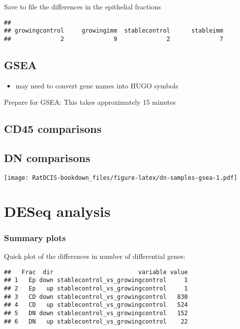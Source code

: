 \documentclass[
]{book}
\providecommand{\tightlist}{%
  \setlength{\itemsep}{0pt}\setlength{\parskip}{0pt}}
\begin{document}
Save to file the differences in the epithelial fractions

\begin{verbatim}
## 
## growingcontrol     growingimm  stablecontrol      stableimm 
##              2              9              2              7
\end{verbatim}

\hypertarget{gsea}{%
\section{GSEA}\label{gsea}}

\begin{itemize}
\tightlist
\item
  may need to convert gene names into HUGO symbols
\end{itemize}

Prepare for GSEA: This takes approximately 15 minutes

\hypertarget{cd45-comparisons}{%
\section{CD45 comparisons}\label{cd45-comparisons}}

\hypertarget{dn-comparisons}{%
\section{DN comparisons}\label{dn-comparisons}}

\texttt{[image: RatDCIS-bookdown\_files/figure-latex/dn-samples-gsea-1.pdf]}

\hypertarget{deseq-analysis-1}{%
\chapter{DESeq analysis}\label{deseq-analysis-1}}

\hypertarget{summary-plots}{%
\subsection{Summary plots}\label{summary-plots}}

Quick plot of the differences in number of differential genes:

\begin{verbatim}
##   Frac  dir                        variable value
## 1   Ep down stablecontrol_vs_growingcontrol     1
## 2   Ep   up stablecontrol_vs_growingcontrol     1
## 3   CD down stablecontrol_vs_growingcontrol   830
## 4   CD   up stablecontrol_vs_growingcontrol   524
## 5   DN down stablecontrol_vs_growingcontrol   152
## 6   DN   up stablecontrol_vs_growingcontrol    22
\end{verbatim}
\end{document}
